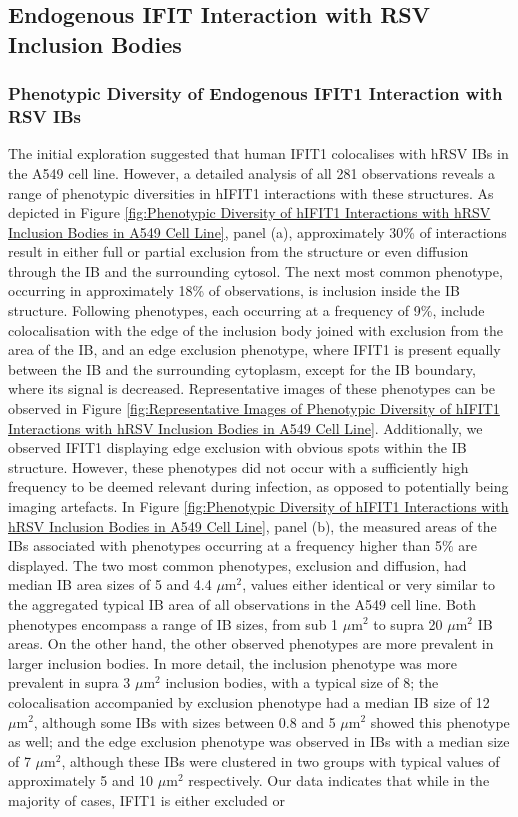 \subsection{Endogenous IFIT Interaction with RSV Inclusion Bodies} \label{subsec:Endogenous IFIT Interaction with RSV Inclusion Bodies}
\subsubsection{Phenotypic Diversity of Endogenous IFIT1 Interaction with RSV IBs}
The initial exploration suggested that human IFIT1 colocalises with hRSV IBs in the A549 cell line. However, a detailed analysis of all 281 observations reveals a range of phenotypic diversities in hIFIT1 interactions with these structures. As depicted in Figure \ref{fig:Phenotypic Diversity of hIFIT1 Interactions with hRSV Inclusion Bodies in A549 Cell Line}, panel (a), approximately 30\% of interactions result in either full or partial exclusion from the structure or even diffusion through the IB and the surrounding cytosol. The next most common phenotype, occurring in approximately 18\% of observations, is inclusion inside the IB structure. Following phenotypes, each occurring at a frequency of 9\%, include colocalisation with the edge of the inclusion body joined with exclusion from the area of the IB, and an edge exclusion phenotype, where IFIT1 is present equally between the IB and the surrounding cytoplasm, except for the IB boundary, where its signal is decreased. Representative images of these phenotypes can be observed in Figure \ref{fig:Representative Images of Phenotypic Diversity of hIFIT1 Interactions with hRSV Inclusion Bodies in A549 Cell Line}. Additionally, we observed IFIT1 displaying edge exclusion with obvious spots within the IB structure. However, these phenotypes did not occur with a sufficiently high frequency to be deemed relevant during infection, as opposed to potentially being imaging artefacts. In Figure \ref{fig:Phenotypic Diversity of hIFIT1 Interactions with hRSV Inclusion Bodies in A549 Cell Line}, panel (b), the measured areas of the IBs associated with phenotypes occurring at a frequency higher than 5\% are displayed. The two most common phenotypes, exclusion and diffusion, had median IB area sizes of 5 and 4.4 \(\mu \mbox{m}^2\), values either identical or very similar to the aggregated typical IB area of all observations in the A549 cell line. Both phenotypes encompass a range of IB sizes, from sub 1 \(\mu \mbox{m}^2\) to supra 20 \(\mu \mbox{m}^2\) IB areas. On the other hand, the other observed phenotypes are more prevalent in larger inclusion bodies. In more detail, the inclusion phenotype was more prevalent in supra 3 \(\mu \mbox{m}^2\) inclusion bodies, with a typical size of 8; the colocalisation accompanied by exclusion phenotype had a median IB size of 12 \(\mu \mbox{m}^2\), although some IBs with sizes between 0.8 and 5 \(\mu \mbox{m}^2\) showed this phenotype as well; and the edge exclusion phenotype was observed in IBs with a median size of 7 \(\mu \mbox{m}^2\), although these IBs were clustered in two groups with typical values of approximately 5 and 10 \(\mu \mbox{m}^2\) respectively. Our data indicates that while in the majority of cases, IFIT1 is either excluded or 